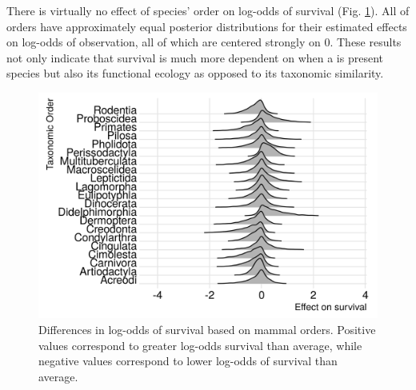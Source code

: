 \documentclass[12pt,letterpaper]{article}
\begin{document}
There is virtually no effect of species' order on log-odds of survival (Fig. \ref{fig:order_surv}). All of orders have approximately equal posterior distributions for their estimated effects on log-odds of observation, all of which are centered strongly on 0. These results not only indicate that survival is much more dependent on when a is present species but also its functional ecology as opposed to its taxonomic similarity. 
\begin{figure}[ht]
  \centering
  \includegraphics[width=\textwidth,height=0.4\textheight,keepaspectratio=true]{figure/order_survival_bd}
  \caption{Differences in log-odds of survival based on mammal orders. Positive values correspond to greater log-odds survival than average, while negative values correspond to lower log-odds of survival than average.}
  \label{fig:order_surv}
\end{figure}
\end{document}
